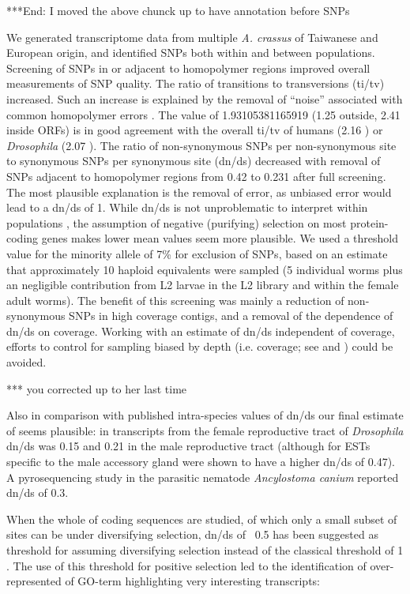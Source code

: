 \documentclass[10pt]{bmc_article}
\newenvironment{bmcformat}{\begin{raggedright}\baselineskip20pt\sloppy\setboolean{publ}{false}}{\end{raggedright}\baselineskip20pt\sloppy}
\begin{document}
\begin{bmcformat}
***End: I moved the above chunck up to have annotation before SNPs

We generated transcriptome data from multiple \textit{A. crassus} of
Taiwanese and European origin, and identified SNPs both within and
between populations. Screening of SNPs in or adjacent to homopolymer
regions improved overall measurements of SNP quality. The ratio of
transitions to transversions (ti/tv) increased. Such an increase is
explained by the removal of “noise” associated with common homopolymer
errors \cite{pmid21685085}. The value of 1.93105381165919
(1.25 outside, 2.41 inside
ORFs) is in good agreement with the overall ti/tv of humans (2.16
\cite{pmid21169219}) or \textit{Drosophila} (2.07
\cite{pmid21143862}). The ratio of non-synonymous SNPs per
non-synonymous site to synonymous SNPs per synonymous site (dn/ds)
decreased with removal of SNPs adjacent to homopolymer regions from
0.42 to 0.231 after
full screening. The most plausible explanation is the removal of
error, as unbiased error would lead to a dn/ds of 1. While dn/ds is
not unproblematic to interpret within populations \cite{pmid19081788},
the assumption of negative (purifying) selection on most
protein-coding genes makes lower mean values seem more plausible. We
used a threshold value for the minority allele of 7\% for exclusion of
SNPs, based on an estimate that approximately 10 haploid equivalents
were sampled (5 individual worms plus an negligible contribution from
L2 larvae in the L2 library and within the female adult worms). The
benefit of this screening was mainly a reduction of non-synonymous
SNPs in high coverage contigs, and a removal of the dependence of
dn/ds on coverage. Working with an estimate of dn/ds independent of
coverage, efforts to control for sampling biased by depth
(i.e. coverage; see \cite{pmid18590545} and \cite{pmid20478048}) could
be avoided.

*** you corrected up to her last time

Also in comparison with published intra-species values of dn/ds our
final estimate of seems plausible: in transcripts from the female
reproductive tract of \textit{Drosophila} dn/ds was 0.15
\cite{pmid15579698} and 0.21 in the male reproductive tract
\cite{pmid11404480} (although for ESTs specific to the male accessory
gland were shown to have a higher dn/ds of 0.47). A pyrosequencing
study in the parasitic nematode \textit{Ancylostoma canium}
\cite{pmid20470405} reported dn/ds of 0.3.

When the whole of coding sequences are studied, of which only a small
subset of sites can be under diversifying selection, dn/ds of ~0.5 has
been suggested as threshold for assuming diversifying selection
\cite{pmid15579698} instead of the classical threshold of 1
\cite{pmid6449605}. The use of this threshold for positive selection
led to the identification of over-represented of GO-term highlighting
very interesting transcripts:


\end{bmcformat}
\end{document}
